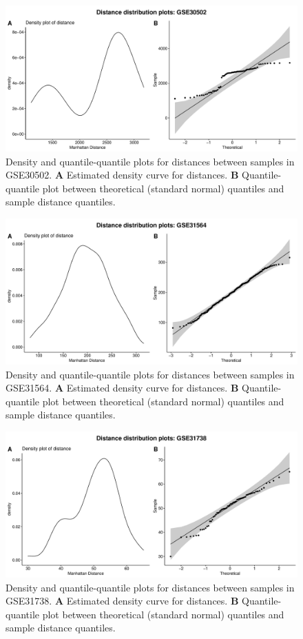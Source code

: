 \documentclass[10pt,letterpaper]{article}\usepackage[]{graphicx}\usepackage[]{color}
\begin{document}
\begin{figure}[H]
	\includegraphics[width=\textwidth]{manhattan-distance_hist_GSE30502.pdf}
	\caption{Density and quantile-quantile plots for distances between samples in GSE30502. \textbf{A} Estimated density curve for distances. \textbf{B} Quantile-quantile plot between theoretical (standard normal) quantiles and sample distance quantiles.}
\end{figure}

\begin{figure}[H]
	\includegraphics[width=\textwidth]{manhattan-distance_hist_GSE31564.pdf}
	\caption{Density and quantile-quantile plots for distances between samples in GSE31564. \textbf{A} Estimated density curve for distances. \textbf{B} Quantile-quantile plot between theoretical (standard normal) quantiles and sample distance quantiles.}
\end{figure}

\begin{figure}[H]
	\includegraphics[width=\textwidth]{manhattan-distance_hist_GSE31738.pdf}
	\caption{Density and quantile-quantile plots for distances between samples in GSE31738. \textbf{A} Estimated density curve for distances. \textbf{B} Quantile-quantile plot between theoretical (standard normal) quantiles and sample distance quantiles.}
\end{figure}
\end{document}
